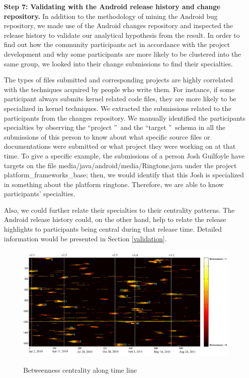 \documentclass[10pt, conference, compsocconf]{IEEEtran}
\begin{document}
\textbf{Step 7: Validating with the Android release history and change repository.} In addition to the methodology of mining the Android bug repository, we made use of the Android changes repository and inspected the release history to validate our analytical hypothesis from the result. In order to find out how the community participants act in accordance with the project development and why some participants are more likely to be clustered into the same group, we looked into their change submissions to find their specialties.

The types of files submitted and corresponding projects are highly correlated with the techniques acquired by people who write them. For instance, if some participant always submits kernel related code files, they are more likely to be specialized in kernel techniques. We extracted the submissions related to the participants from the changes repository. We manually identified the participants specialties by observing the \textquotedblleft project \textquotedblright \ and the \textquotedblleft target \textquotedblright \ schema in all the submissions of this person to know about what specific source files or documentations were submitted or what project they were working on at that time. To give a specific example, the submissions of a person Josh Guilfoyle have targets on the file media/java/android/media/Ringtone.java under the project platform\_frameworks\_base; then, we would identify that this Josh is specialized in something about the platform ringtone. 
Therefore, we are able to know participants' specialties. 

Also, we could further relate their specialties to their centrality patterns. The Android release history could, on the other hand, help to relate the release highlights to participants being central during that release time. Detailed information would be presented in Section \ref{validation}. 

\begin{figure}[ht]
\centering
\includegraphics[width=18cm]{result.pdf}
\label{result}
\caption{Betweenness centrality along time line}
\end{figure}
\end{document}
